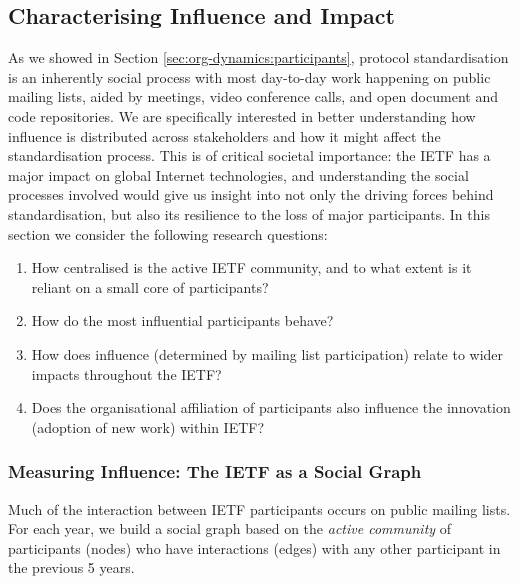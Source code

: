 \documentclass[twocolumn,10pt]{article}
\begin{document}
\subsection{Characterising Influence and Impact}
\label{sec:org-dynamics:influence}



As we showed in Section \ref{sec:org-dynamics:participants}, protocol
standardisation is an inherently social process with most day-to-day work
happening on public mailing lists, aided by meetings, video conference
calls, and open document and code repositories.  We are specifically
interested in better understanding how influence is distributed across
stakeholders and how it might affect the standardisation process.  This is
of critical societal importance: the IETF has a major impact on global
Internet technologies, and understanding the social processes involved
would give us insight into not only the driving forces behind
standardisation, but also its resilience to the loss of major participants.
In this section we consider the following research questions: 
\begin{enumerate}
  \item How centralised is the active IETF community, and to what extent
    is it reliant on a small core of participants? 
  \item How do the most influential participants behave? 
  \item How does influence (determined by mailing list participation)
    relate to wider impacts throughout the IETF?
  \item Does the organisational affiliation of participants also
    influence the innovation (adoption of new work) within IETF?
\end{enumerate}

\subsubsection{Measuring Influence: The IETF as a Social Graph}

\label{subsec:measuring_influence}

Much of the interaction between IETF participants occurs on public mailing
lists.  For each year, we build a social graph based on the \emph{active
community} of participants (nodes) who have interactions (edges) with any
other participant in the previous 5 years. 
\end{document}
